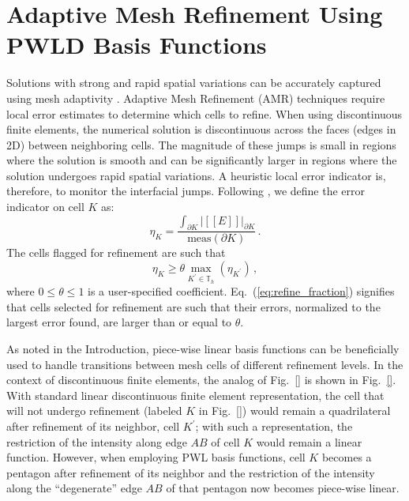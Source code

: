 \documentclass[preprint,10pt]{elsarticle}
\newcommand{\jmp}[1]{[\![#1]\!]}                     %
\newcommand{\eqt}[1]{Eq.~(\ref{#1})}                     %
\newcommand{\fig}[1]{Fig.~\ref{#1}}                      %
\begin{document}
\section{Adaptive Mesh Refinement Using PWLD Basis Functions} \label{sec:amr}

Solutions with strong and rapid spatial variations can be accurately captured using mesh adaptivity
\cite{amr_stuff}. Adaptive Mesh Refinement (AMR) techniques require local error estimates to determine
which cells to refine. When using discontinuous finite elements, the numerical solution is discontinuous
across the faces (edges in 2D) between neighboring cells. The magnitude of these jumps is 
small in regions where the solution is smooth and can be significantly larger in regions where
the solution undergoes rapid spatial variations. A heuristic local error indicator is, therefore, to
monitor the interfacial jumps. Following \cite{leight2007,ragusa-wang1,ragusa-wang2}, we define 
the error indicator on cell $K$ as:
\begin{equation} \label{eq:error_indicator}
  \eta_K = \frac{\int_{\partial K} |\jmp{E}|_{\partial K}} {\text{meas}(\partial K)} \, .
\end{equation}  
%
The cells flagged for refinement are such that 
\begin{equation} \label{eq:refine_fraction}
  \eta_K \ge  \theta \max_{K^\prime \in \mathbb{T}_h} \left( \eta_{K^\prime} \right) \, ,
\end{equation}  
where $0 \le \theta \le 1$ is a user-specified coefficient. \eqt{eq:refine_fraction} signifies
that cells selected for refinement are such that their errors, normalized to the largest error found, 
are larger than or equal to $\theta$.

As noted in the Introduction, piece-wise linear basis functions can be beneficially used to handle transitions
between mesh cells of different refinement levels. In the context of discontinuous finite elements, the
analog of \fig{} is shown in \fig{}. With standard linear discontinuous finite element representation, 
the cell that will not undergo refinement (labeled $K$ in \fig{}) would remain a quadrilateral 
after refinement of its neighbor, cell $K^\prime$; with such a representation, the restriction of the intensity 
along edge $AB$ of cell $K$ would remain a linear function. However, when employing 
PWL basis functions, cell $K$ becomes a pentagon after refinement of its neighbor and the 
restriction of the intensity along the ``degenerate'' edge $AB$ of that pentagon now becomes 
piece-wise linear.
\end{document}
